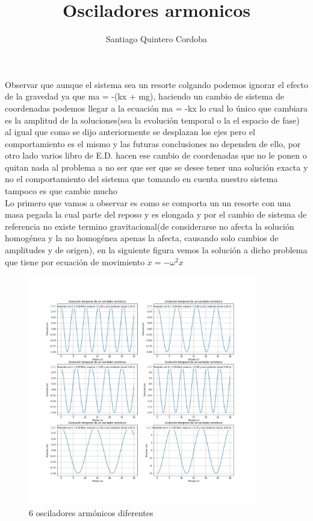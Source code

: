 \documentclass[12pt,a4paper]{article}
\title{Osciladores armonicos}
\author{Santiago Quintero Cordoba }
\date{}
\begin{document}
\maketitle

\section*{}

Observar que aunque el sistema sea un resorte colgando podemos ignorar el efecto de la gravedad ya que ma = -(kx + mg), haciendo un cambio de sistema de coordenadas podemos llegar a la ecuación ma = -kx lo cual lo único que cambiara es la amplitud de la soluciones(sea la evolución temporal o la el espacio de fase) al igual que como se dijo anteriormente se desplazan los ejes pero el comportamiento es el mismo y las futuras conclusiones no dependen de ello, por otro lado varios libro de E.D. hacen ese cambio de coordenadas que no le ponen o quitan nada al problema a no ser que ser que se desee tener una solución exacta y no el comportamiento del sistema que tomando en cuenta nuestro sistema tampoco es que cambie mucho
\\

Lo primero que vamos a observar es como se comporta un un resorte con una masa pegada la cual parte del reposo y es elongada y por el cambio de sistema de referencia no existe termino gravitacional(de considerarse no afecta la solución homogénea y la no homogénea apenas la afecta, causando solo cambios de amplitudes y de origen), en la siguiente figura vemos la solución a dicho problema que tiene por ecuación de movimiento $\ddot{x} = - \omega^2 x$

\begin{figure}[H]
    \centering
    \includegraphics[width=10cm]{oscilador.jpg}
    \caption{6 osciladores armónicos diferentes}
    \label{fig:oscilador}
\end{figure}
\end{document}
